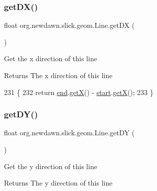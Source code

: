 \subsubsection{\texorpdfstring{get\+D\+X()}{getDX()}}
{\footnotesize\ttfamily float org.\+newdawn.\+slick.\+geom.\+Line.\+get\+DX (\begin{DoxyParamCaption}{ }\end{DoxyParamCaption})\hspace{0.3cm}{\ttfamily [inline]}}

Get the x direction of this line

\begin{DoxyReturn}{Returns}
The x direction of this line 
\end{DoxyReturn}

\begin{DoxyCode}
231                          \{
232         \textcolor{keywordflow}{return} \mbox{\hyperlink{classorg_1_1newdawn_1_1slick_1_1geom_1_1_line_abc89f3da558e2d29ad48f3c453c25f92}{end}}.\mbox{\hyperlink{classorg_1_1newdawn_1_1slick_1_1geom_1_1_vector2f_ad706bc5b80f139236e643a274947262b}{getX}}() - \mbox{\hyperlink{classorg_1_1newdawn_1_1slick_1_1geom_1_1_line_aaf3a6c6053990b96a501b80081258f92}{start}}.\mbox{\hyperlink{classorg_1_1newdawn_1_1slick_1_1geom_1_1_vector2f_ad706bc5b80f139236e643a274947262b}{getX}}();
233     \}
\end{DoxyCode}
\mbox{\label{classorg_1_1newdawn_1_1slick_1_1geom_1_1_line_a59e779e96e6d5dd2095abf4ed4abb5ce}} 
\subsubsection{\texorpdfstring{get\+D\+Y()}{getDY()}}
{\footnotesize\ttfamily float org.\+newdawn.\+slick.\+geom.\+Line.\+get\+DY (\begin{DoxyParamCaption}{ }\end{DoxyParamCaption})\hspace{0.3cm}{\ttfamily [inline]}}

Get the y direction of this line

\begin{DoxyReturn}{Returns}
The y direction of this line 
\end{DoxyReturn}

